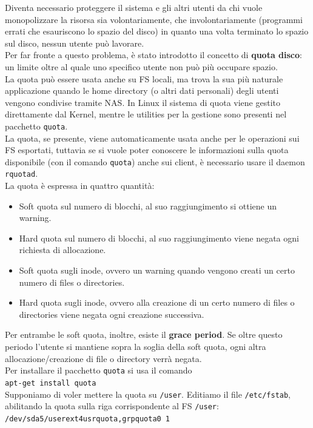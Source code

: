 \documentclass[a4paper]{report}
\newcommand\tab[1][1cm]{\hspace*{#1}}
\begin{document}
Diventa necessario proteggere il sistema e gli altri utenti da chi vuole monopolizzare la risorsa sia volontariamente, che involontariamente (programmi errati che esauriscono lo spazio del disco) in quanto una volta terminato lo spazio sul disco, nessun utente può lavorare.\\
Per far fronte a questo problema, è stato introdotto il concetto di \textbf{quota disco}: un limite oltre al quale uno specifico utente non può più occupare spazio.\\
La quota può essere usata anche su FS locali, ma trova la sua più naturale applicazione quando le home directory (o altri dati personali) degli utenti vengono condivise tramite NAS. In Linux il sistema di quota viene gestito direttamente dal Kernel, mentre le utilities per la gestione sono presenti nel pacchetto \texttt{quota}.\\
La quota, se presente, viene automaticamente usata anche per le operazioni sui FS esportati, tuttavia se si vuole poter conoscere le informazioni sulla quota disponibile (con il comando \texttt{quota}) anche sui client, è necessario usare il daemon \texttt{rquotad}.\\
La quota è espressa in quattro quantità:
\begin{itemize}
\item Soft quota sul numero di blocchi, al suo raggiungimento si ottiene un warning.
\item Hard quota sul numero di blocchi, al suo raggiungimento viene negata ogni richiesta di allocazione.
\item Soft quota sugli inode, ovvero un warning quando vengono creati un certo numero di files o directories.
\item Hard quota sugli inode, ovvero alla creazione di un certo numero di files o directories viene negata ogni creazione successiva.
\end{itemize}
Per entrambe le soft quota, inoltre, esiste il \textbf{grace period}. Se oltre questo periodo l'utente si mantiene sopra la soglia della soft quota, ogni altra allocazione/creazione di file o directory verrà negata.\\
Per installare il pacchetto \texttt{quota} si usa il comando\\
\tab\texttt{apt-get install quota}\\
Supponiamo di voler mettere la quota su \texttt{/user}. Editiamo il file \texttt{/etc/fstab}, abilitando la quota sulla riga corrispondente al FS \texttt{/user}:\\
\tab\texttt{/dev/sda5\tab /user\tab ext4\tab usrquota,grpquota\tab 0 1}\\
\end{document}
